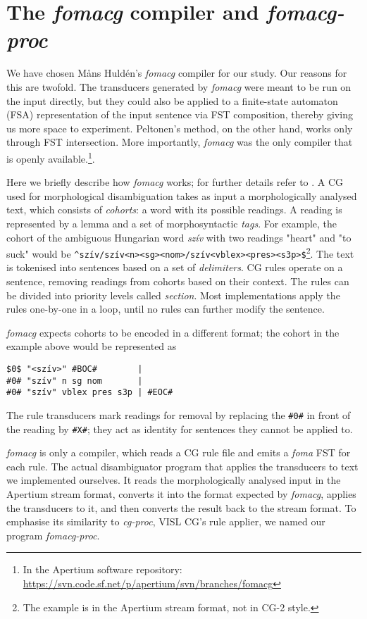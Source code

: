 \documentclass[11pt]{article}
\begin{document}
\section{The \emph{fomacg} compiler and \emph{fomacg-proc}}
\label{sec:fomacg}

We have chosen Måns Huldén's \emph{fomacg} compiler for our study. Our
reasons for this are twofold. The transducers generated by \emph{fomacg} were
meant to be run on the input directly, but they could also be applied to a
finite-state automaton (FSA) representation of the input sentence via FST
composition, thereby giving us more space to experiment. Peltonen's method,
on the other hand, works only through FST intersection. More importantly,
\emph{fomacg} was the only compiler that is openly
available.\footnote{In the Apertium software repository:
\url{https://svn.code.sf.net/p/apertium/svn/branches/fomacg}}.

Here we briefly describe how \emph{fomacg} works; for further details refer to
\cite{Hulden:2011}. A CG used for morphological disambiguation takes as input
a morphologically analysed text, which consists of \emph{cohorts}: a word with
its possible readings. A reading is
represented by a lemma and a set of morphosyntactic \emph{tags}. For example, the cohort of
the ambiguous Hungarian word \textit{szív} with two readings "heart" and
"to suck" would be
\texttt{\^{}szív/szív<n><sg><nom>/szív<vblex><pres><s3p>\$}\footnote{
The example is in the Apertium stream format, not in CG-2 style.}. The text is
tokenised into sentences based on a set of \emph{delimiters}. CG rules
operate on a sentence, removing readings from cohorts based on their context.
The rules can be divided into priority levels called \emph{section}. Most
implementations apply the rules one-by-one in a loop, until no rules can further
modify the sentence.

\emph{fomacg} expects cohorts to be encoded in a different format; the cohort in
the example above would be represented as
\begin{verbatim}
$0$ "<szív>" #BOC#        |
#0# "szív" n sg nom       |
#0# "szív" vblex pres s3p | #EOC#
\end{verbatim}
The rule transducers mark readings for removal by replacing the \texttt{\#0\#}
in front of the reading by \texttt{\#X\#}; they act as identity for sentences
they cannot be applied to.

\emph{fomacg} is only a compiler, which reads a CG rule file and emits a
\emph{foma} FST for each rule. The actual disambiguator program that applies the
transducers to text we implemented ourselves. It reads the morphologically
analysed input in the Apertium stream format, converts it into the format
expected by \emph{fomacg}, applies the transducers to it, and then converts the
result back to the stream format. To emphasise its similarity to \emph{cg-proc},
VISL CG's rule applier, we named our program \emph{fomacg-proc}.
\end{document}
